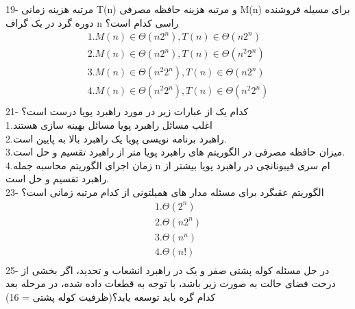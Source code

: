 \documentclass{book}
\begin{document}
19- مرتبه هزینه زمانی T(n) و مرتبه هزینه حافظه مصرفی M(n) برای مسیله فروشنده دوره گرد در یک گراف n  راسی کدام است؟\\
\begin{align*}
1.M(n) \in \Theta (n2^n) , T(n) \in \Theta (n2^n) \\ 
2.M(n) \in \Theta (n2^n) , T(n) \in \Theta (n^2 2^n)\\
3.M(n) \in \Theta (n^2 2^n) , T(n) \in \Theta (n 2^n)\\
4.M(n) \in \Theta (n^2 2^n) , T(n) \in \Theta (n^2 2^n)\\
\end{align*}
21- کدام یک از عبارات زیر در مورد راهبرد پویا درست است؟\\
1.اغلب مسائل راهبرد پویا  مسائل بهینه سازی هستند\\
2.راهبرد برنامه نویسی پویا یک راهبرد بالا به پایین است.\\
3.میزان حافظه مصرفی در الگوریتم های راهبرد پویا متر از راهبرد تقسیم و حل است.\\
4.زمان  اجرای الگوریتم محاسبه جمله n ام سری فیبونانچی در راهبرد پویا بیشتر از راهبرد تقسیم و حل است.\\

23- الگوریتم عقبگرد برای مسئله مدار های همیلتونی از کدام مرتبه زمانی است؟\\
\begin{align*}
1.\Theta(2^n) \\
2.\Theta (n2^n)\\
3. \Theta(n^n)\\
4.\Theta(n!)\\
\end{align*}
25- در حل مسئله کوله پشتی صفر و یک در راهبرد انشعاب و تحدید، اگر بخشی از درحت فضای حالت به صورت زیر باشد، با توجه به قطعات داده شده، در مرحله بعد کدام گره باید توسعه یابد؟(ظرفیت کوله پشتی = 16)\\
\\
  
\end{document}
